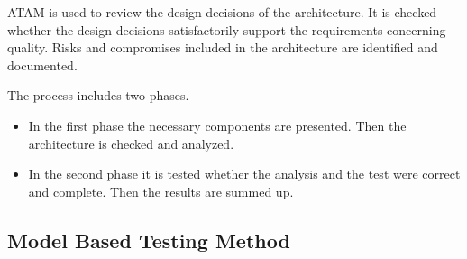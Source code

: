 \documentclass{template/openetcs_report}
\begin{document}
ATAM \cite{ATAM} is used to review the design decisions of the architecture. 
It is checked whether the design decisions satisfactorily 
support the requirements concerning quality. Risks and 
compromises included in the architecture are identified 
and documented.

The process includes two phases. 
\begin{itemize}
\item In the first phase the necessary components 
	are presented. Then the architecture is checked and analyzed. 
\item In the second phase it is tested whether the analysis 
	and the test were correct and complete. Then the 
	results are summed up.
\end{itemize}

\subsection{Model Based Testing Method}
\label{subsec:mbt}
\end{document}
